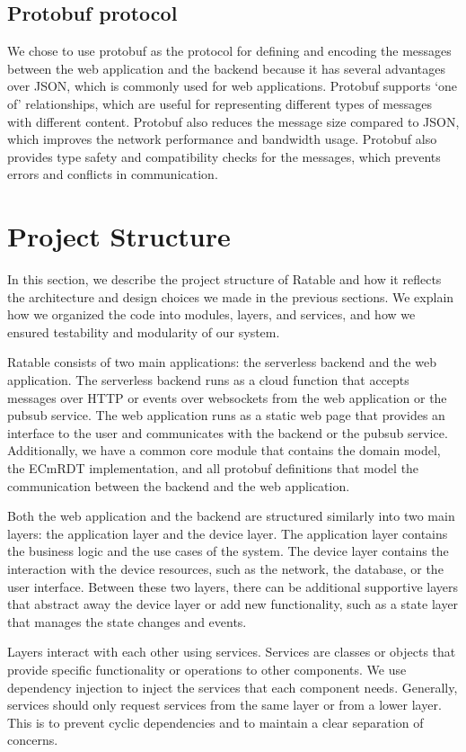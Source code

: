 \documentclass[
	ngerman,
	ruledheaders=section,   %
	class=report,		    %
	thesis={type=bachelor}, %
	accentcolor=9c,			%
	custommargins=true,    %
	marginpar=false,        %
	parskip=half-,          %
	fontsize=11pt,          %
]{tudapub}
\begin{document}
\subsection{Protobuf protocol}
We chose to use protobuf as the protocol for defining and encoding the messages between the web application and the backend because it has several advantages over JSON, which is commonly used for web applications. Protobuf supports ‘one of’ relationships, which are useful for representing different types of messages with different content. Protobuf also reduces the message size compared to JSON, which improves the network performance and bandwidth usage. Protobuf also provides type safety and compatibility checks for the messages, which prevents errors and conflicts in communication.

\section{Project Structure}
In this section, we describe the project structure of Ratable and how it reflects the architecture and design choices we made in the previous sections. We explain how we organized the code into modules, layers, and services, and how we ensured testability and modularity of our system.

Ratable consists of two main applications: the serverless backend and the web application. The serverless backend runs as a cloud function that accepts messages over HTTP or events over websockets from the web application or the pubsub service. The web application runs as a static web page that provides an interface to the user and communicates with the backend or the pubsub service. Additionally, we have a common core module that contains the domain model, the ECmRDT implementation, and all protobuf definitions that model the communication between the backend and the web application.

Both the web application and the backend are structured similarly into two main layers: the application layer and the device layer. The application layer contains the business logic and the use cases of the system. The device layer contains the interaction with the device resources, such as the network, the database, or the user interface. Between these two layers, there can be additional supportive layers that abstract away the device layer or add new functionality, such as a state layer that manages the state changes and events.

Layers interact with each other using services. Services are classes or objects that provide specific functionality or operations to other components. We use dependency injection to inject the services that each component needs. Generally, services should only request services from the same layer or from a lower layer. This is to prevent cyclic dependencies and to maintain a clear separation of concerns.
\end{document}
